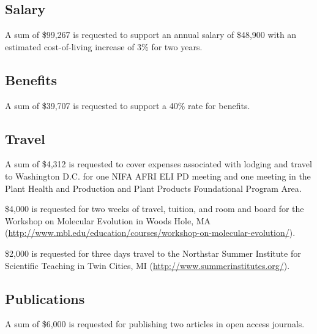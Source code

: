 \documentclass[12pt,letterpaper]{article}
\title{\ruleline{Budget Justification}}
\begin{document}
\maketitle

\subsection{Salary}

A sum of \$99,267 is requested to support an annual salary of \$48,900 with an estimated cost-of-living increase of 3\% for two years.

\subsection{Benefits}

A sum of \$39,707 is requested to support a 40\% rate for benefits.

\subsection{Travel}

A sum of \$4,312 is requested to cover expenses associated with lodging and travel to Washington D.C. for one NIFA AFRI ELI PD meeting and one meeting in the Plant Health and Production and Plant Products Foundational Program Area.

\$4,000 is requested for two weeks of travel, tuition, and room and board for the Workshop on Molecular Evolution in Woods Hole, MA\\
(\url{http://www.mbl.edu/education/courses/workshop-on-molecular-evolution/}).

\$2,000 is requested for three days travel to the Northstar Summer Institute for Scientific Teaching in Twin Cities, MI (\url{http://www.summerinstitutes.org/}).

\subsection{Publications}

A sum of \$6,000 is requested for publishing two articles in open access journals.
\end{document}
